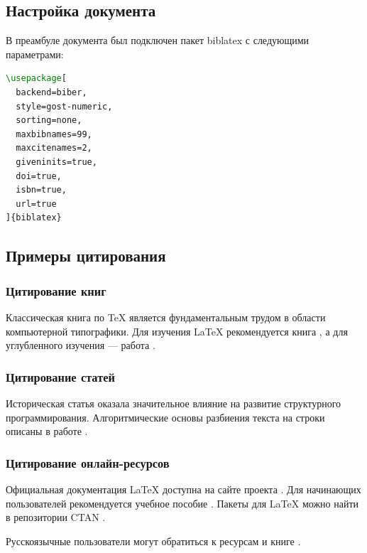 \documentclass[12pt, a4paper]{article}
\begin{document}
\subsection{Настройка документа}

В преамбуле документа был подключен пакет biblatex с следующими параметрами:

\begin{lstlisting}[language=TeX, caption={Настройка biblatex}]
\usepackage[
  backend=biber,
  style=gost-numeric,
  sorting=none,
  maxbibnames=99,
  maxcitenames=2,
  giveninits=true,
  doi=true,
  isbn=true,
  url=true
]{biblatex}

\end{lstlisting}

\subsection{Примеры цитирования}

\subsubsection{Цитирование книг}

Классическая книга по TeX \parencite{knuth1984} является фундаментальным трудом в области компьютерной типографики. Для изучения LaTeX рекомендуется книга \textcite{lamport1994}, а для углубленного изучения — работа \textcite{mittelbach2004}.

\subsubsection{Цитирование статей}

Историческая статья \textcite{dijkstra1968} оказала значительное влияние на развитие структурного программирования. Алгоритмические основы разбиения текста на строки описаны в работе \parencite{knuth1977}.

\subsubsection{Цитирование онлайн-ресурсов}

Официальная документация LaTeX доступна на сайте проекта \parencite{latex-project}. Для начинающих пользователей рекомендуется учебное пособие \parencite{overleaf-docs}. Пакеты для LaTeX можно найти в репозитории CTAN \parencite{ctan}.

Русскоязычные пользователи могут обратиться к ресурсам \parencite{latex-ru} и книге \textcite{lvovsky2003}.
\end{document}

